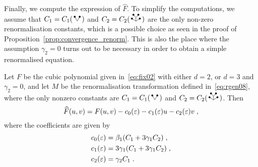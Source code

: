 \documentclass[reqno,11pt]{article}
\begin{document}
Finally, we compute the expression of $\widehat F$. To simplify the
computations, we assume that $C_1=C_1(\RSV)$ and $C_2=C_2(\RSWV)$ are the
only non-zero renormalisation constants, which is a possible choice as seen in
the proof of Proposition~\ref{prop:convergence_renorm}. This is also the place
where the assumption $\gamma_2=0$ turns out to be necessary in order to obtain a
simple renormalised equation. 

\begin{prop}
\label{prop:Fhat}
Let $F$ be the cubic polynomial given in~\eqref{eq:fix02} with
either $d=2$, or $d=3$ and $\gamma_2=0$, and
let $M$ be the renormalisation transformation defined in~\eqref{eq:rgen08},
where the only nonzero constants are $C_1=C_1(\RSV)$ and $C_2=C_2(\RSWV)$. Then 
\begin{equation}
 \label{eq:cubic01}
 \widehat F(u,v) = 
 F(u,v) - c_0(\eps) - c_1(\eps)u {}- c_2(\eps)v\;,
\end{equation}
where the coefficients are given by
\begin{align}
\nonumber
c_0(\eps) &= \beta_1 (C_1 + 3\gamma_1 C_2)\;, \\
\nonumber
c_1(\eps) &= 3\gamma_1 (C_1 + 3\gamma_1 C_2)\;, \\
c_2(\eps) &= \gamma_2 C_1\;.
\label{eq:cubic02}
\end{align}
\end{prop}
%
\end{document}
